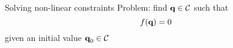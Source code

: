 %
%

\begin {frame} {Solving non-linear constraints}
  Problem: find $\textbf{q}\in{\cal C}$ such that
  $$
  f (\textbf{q}) = 0
  $$
  given an initial value $\textbf{q}_0\in{\cal C}$
\end {frame}

